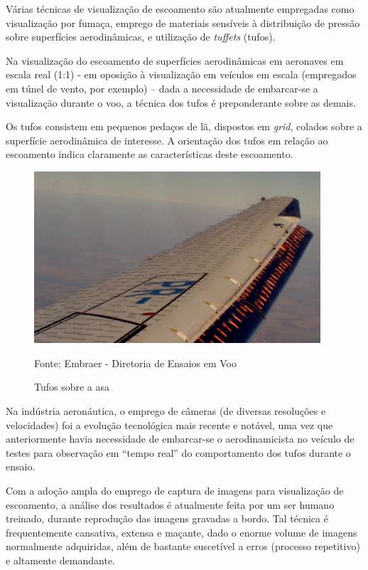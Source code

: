 \documentclass[12pt, a4paper]{article}
\newcommand{\source}[1]{\vspace{-5pt} \caption*{ Fonte: {#1}} }
\begin{document}
Várias técnicas de visualização de escoamento \cite{Fisher1988} são atualmente empregadas como visualização por fumaça, emprego de materiais sensíveis à distribuição de pressão sobre superfícies aerodinâmicas, e utilização de \emph{tuffets} (tufos).

Na visualização do escoamento de superfícies aerodinâmicas em aeronaves em escala real (1:1) - em oposição à visualização em veículos em escala (empregados em túnel de vento, por exemplo) – dada a necessidade de embarcar-se a visualização durante o voo, a técnica dos tufos é preponderante sobre as demais.

Os tufos consistem em pequenos pedaços de lã, dispostos em \emph{grid}, colados sobre a superfície aerodinâmica de interesse. A orientação dos tufos em relação ao escoamento indica claramente as características deste escoamento.

\begin{figure} [ht]
    \centering
    \includegraphics[width=0.95\textwidth]{tuffets.png}
    \caption{Tufos sobre a asa}
    \source{Embraer - Diretoria de Ensaios em Voo}
    \label{fig:tuffets}
\end{figure}

Na indústria aeronáutica, o emprego de câmeras (de diversas resoluções e velocidades) foi a evolução tecnológica mais recente e notável, uma vez que anteriormente havia necessidade de embarcar-se o aerodinamicista no veículo de testes para observação em “tempo real” do comportamento dos tufos durante o ensaio.

Com a adoção ampla do emprego de captura de imagens para visualização de escoamento, a análise dos resultados é atualmente feita por um ser humano treinado, durante reprodução das imagens gravadas a bordo. Tal técnica é frequentemente cansativa, extensa e maçante, dado o enorme volume de imagens normalmente adquiridas, além de bastante suscetível a erros (processo repetitivo) e altamente demandante.
\end{document}
